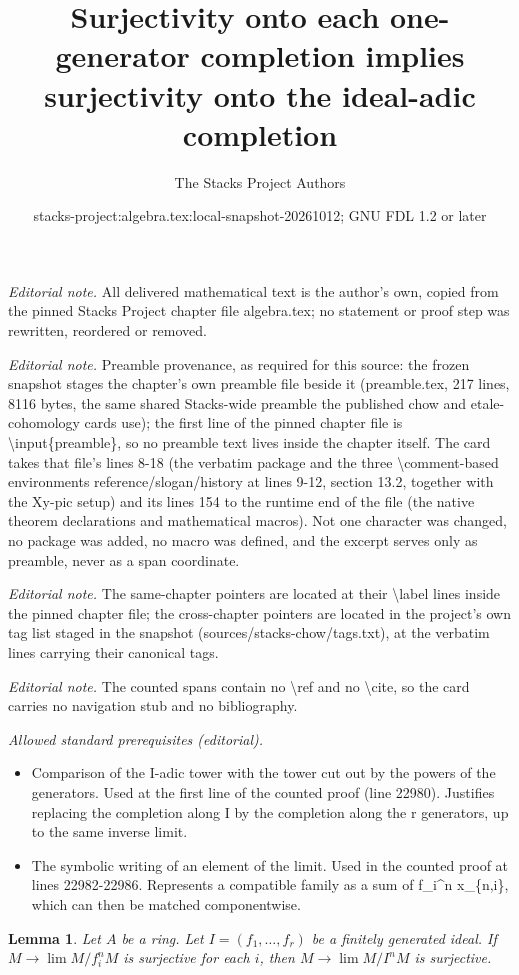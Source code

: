 \documentclass[10pt,a4paper]{amsart}
\title{Surjectivity onto each one-generator completion implies surjectivity onto the ideal-adic completion}
\author{The Stacks Project Authors}
\date{stacks-project:algebra.tex:local-snapshot-20261012; GNU FDL 1.2 or later}
\theoremstyle{plain}
\newtheorem{lemma}[subsection]{Lemma}
\theoremstyle{definition}
\theoremstyle{remark}
\numberwithin{equation}{subsection}
\def\lim{\mathop{\mathrm{lim}}\nolimits}
\begin{document}
\maketitle
\noindent\textit{Editorial note.} All delivered mathematical text is the author's own, copied from the pinned Stacks Project chapter file algebra.tex; no statement or proof step was rewritten, reordered or removed.\par\medskip
\noindent\textit{Editorial note.} Preamble provenance, as required for this source: the frozen snapshot stages the chapter's own preamble file beside it (preamble.tex, 217 lines, 8116 bytes, the same shared Stacks-wide preamble the published chow and etale-cohomology cards use); the first line of the pinned chapter file is \textbackslash{}input\{preamble\}, so no preamble text lives inside the chapter itself. The card takes that file's lines 8-18 (the verbatim package and the three \textbackslash{}comment-based environments reference/slogan/history at lines 9-12, section 13.2, together with the Xy-pic setup) and its lines 154 to the runtime end of the file (the native theorem declarations and mathematical macros). Not one character was changed, no package was added, no macro was defined, and the excerpt serves only as preamble, never as a span coordinate.\par\medskip
\noindent\textit{Editorial note.} The same-chapter pointers are located at their \textbackslash{}label lines inside the pinned chapter file; the cross-chapter pointers are located in the project's own tag list staged in the snapshot (sources/stacks-chow/tags.txt), at the verbatim lines carrying their canonical tags.\par\medskip
\noindent\textit{Editorial note.} The counted spans contain no \textbackslash{}ref and no \textbackslash{}cite, so the card carries no navigation stub and no bibliography.\par\medskip
\noindent\textit{Allowed standard prerequisites (editorial).}\begin{itemize}
\item Comparison of the I-adic tower with the tower cut out by the powers of the generators. Used at the first line of the counted proof (line 22980). Justifies replacing the completion along I by the completion along the r generators, up to the same inverse limit.
\item The symbolic writing of an element of the limit. Used in the counted proof at lines 22982-22986. Represents a compatible family as a sum of f\_i\textasciicircum{}n x\_\{n,i\}, which can then be matched componentwise.
\end{itemize}\medskip
\begin{lemma}
\label{lemma-when-surjective-to-completion}
Let $A$ be a ring. Let $I = (f_1, \ldots, f_r)$ be a finitely
generated ideal. If $M \to \lim M/f_i^nM$ is surjective for
each $i$, then $M \to \lim M/I^nM$ is surjective.
\end{lemma}
\end{document}
